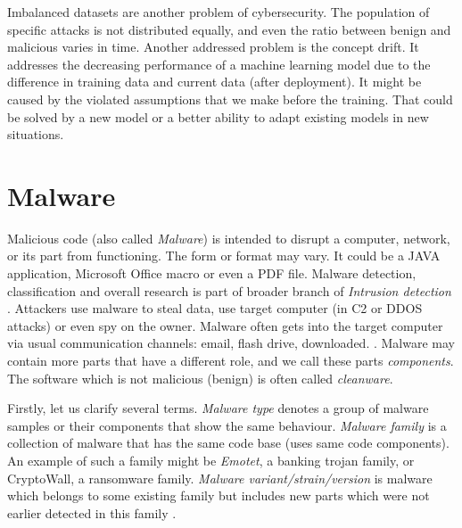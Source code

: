 Imbalanced datasets are another problem of cybersecurity. The population of specific attacks is not distributed equally, and even the ratio between benign and malicious varies in time. Another addressed problem is the concept drift. It addresses the decreasing performance of a machine learning model due to the difference in training data and current data (after deployment).  It might be caused by the violated assumptions that we make before the training. That could be solved by a new model or a better ability to adapt existing models in new situations.

\section{Malware}
Malicious code (also called \emph{Malware}) is intended to disrupt a computer, network, or its part from functioning. The form or format may vary. It could be a JAVA application, Microsoft Office macro or even a PDF file. Malware detection, classification and overall research is part of broader branch of \emph{Intrusion detection} \cite{Cole2009}. Attackers use malware to steal data, use target computer (in C2 or DDOS attacks) or even spy on the owner. Malware often gets into the target computer via usual communication channels: email, flash drive, downloaded. \cite{KA2018}. Malware may contain more parts that have a different role, and we call these parts \emph{components}. The software which is not malicious (benign) is often called \emph{cleanware}.

Firstly, let us clarify several terms. \emph{Malware type} denotes a group of malware samples or their components that show the same behaviour. \emph{Malware family} is a collection of malware that has the same code base (uses same code components). An example of such a family might be \emph{Emotet}, a banking trojan family, or CryptoWall, a ransomware family. \emph{Malware variant/strain/version} is malware which belongs to some existing family but includes new parts which were not earlier detected in this family \cite{Cohen2019}.

